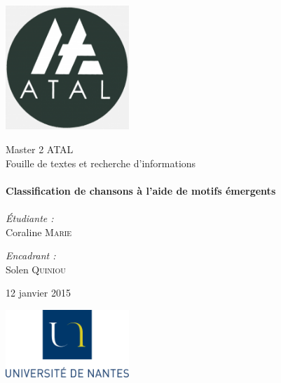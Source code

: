 
\begin{titlepage}
	\begin{center}

		\includegraphics[width=0.35\textwidth]{Figures/ATAL.png}~

		\LARGE{Master 2 \textsc{ATAL}}\\[1.5cm]

		\Large{Fouille de textes et recherche d'informations}\\[0.5cm]

		\HRule \\[0.4cm]
		{ \huge \bfseries Classification de chansons à l'aide de motifs émergents\\[0.4cm] }
		\HRule \\[1.5cm]

		\normalsize		
		\emph{\'Etudiante :}\\
		Coraline \textsc{Marie}

		\vspace{0.5cm}

		\emph{Encadrant :} \\
		Solen \textsc{Quiniou}

		\vspace{1cm}

		{\large 12 janvier 2015}

		\vfill

		
		\includegraphics[width=0.35\textwidth]{Figures/logoUN.png}~\\[2cm]

		

	\end{center}
\end{titlepage}

